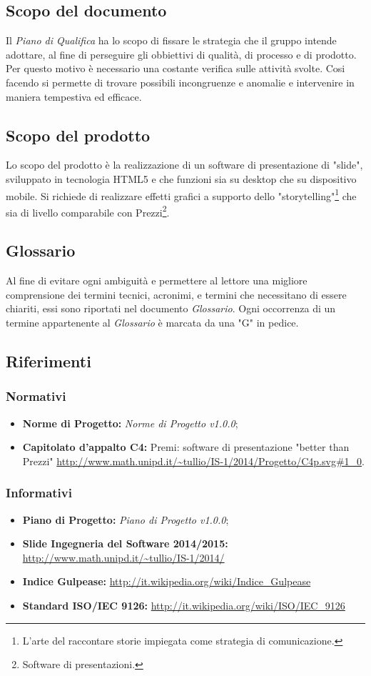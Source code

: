 \subsection{Scopo del documento}
Il \textit{Piano di Qualifica} ha lo scopo di fissare le strategia che il gruppo intende adottare, al fine di perseguire gli obbiettivi di qualità, di processo e di prodotto. Per questo motivo è necessario una costante verifica sulle attività svolte. Cosi facendo si permette di trovare possibili incongruenze e anomalie e intervenire in maniera tempestiva ed efficace.
\subsection{Scopo del prodotto}
Lo scopo del prodotto è la realizzazione di un software di presentazione di "slide", sviluppato in tecnologia HTML5 e che funzioni sia su desktop che su dispositivo mobile. Si richiede di realizzare effetti grafici a supporto dello "storytelling"\footnote{L'arte del raccontare storie impiegata come strategia di comunicazione.} che sia di livello comparabile con Prezzi\footnote{Software di presentazioni.}.
\subsection{Glossario}
Al fine di evitare ogni ambiguità e permettere al lettore una migliore comprensione dei termini tecnici, acronimi, e termini che necessitano di essere chiariti,  essi sono riportati nel documento \textit{Glossario}. 
Ogni occorrenza  di un termine appartenente al \textit{Glossario} è marcata da una "G" in pedice.
\subsection{Riferimenti}
	\subsubsection{Normativi}
	\begin{itemize}
		\item \textbf{Norme di Progetto:} \textit{Norme di Progetto v1.0.0};
		\item \textbf{Capitolato d'appalto C4:} Premi: software di presentazione "better than Prezzi" \url{http://www.math.unipd.it/~tullio/IS-1/2014/Progetto/C4p.svg#1_0}.
	\end{itemize}
	\subsubsection{Informativi}
	\begin{itemize}
		\item \textbf{Piano di Progetto:} \textit{Piano di Progetto v1.0.0};
		\item \textbf{Slide Ingegneria del Software 2014/2015:} \url{http://www.math.unipd.it/~tullio/IS-1/2014/}
		\item \textbf{Indice Gulpease:} \url{http://it.wikipedia.org/wiki/Indice_Gulpease}
		\item \textbf{Standard ISO/IEC 9126:} \url{http://it.wikipedia.org/wiki/ISO/IEC_9126}
	\end{itemize}